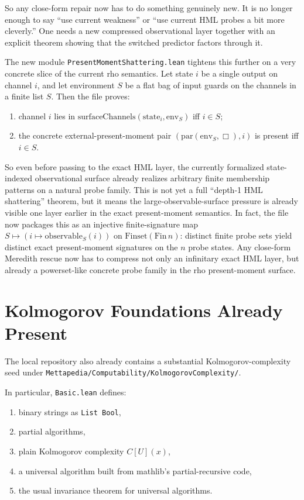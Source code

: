 \documentclass[11pt]{article}
\theoremstyle{remark}
\begin{document}
So any close-form repair now has to do something genuinely new.  It is no
longer enough to say ``use current weakness'' or ``use current HML probes a bit
more cleverly.''  One needs a new compressed observational layer together with
an explicit theorem showing that the switched predictor factors through it.

The new module \texttt{PresentMomentShattering.lean} tightens this further on a
very concrete slice of the current rho semantics.  Let state \(i\) be a single
output on channel \(i\), and let environment \(S\) be a flat bag of input
guards on the channels in a finite list \(S\).  Then the file proves:
\begin{enumerate}[leftmargin=1.5em]
  \item channel \(i\) lies in
  \(\mathrm{surfaceChannels}(\mathrm{state}_i,\mathrm{env}_S)\) iff \(i \in S\);
  \item the concrete external-present-moment pair
  \((\mathrm{par}(\mathrm{env}_S,\Box), i)\) is present iff \(i \in S\).
\end{enumerate}

So even before passing to the exact HML layer, the currently formalized
state-indexed observational surface already realizes arbitrary finite
membership patterns on a natural probe family.  This is not yet a full
``depth-1 HML shattering'' theorem, but it means the large-observable-surface
pressure is already visible one layer earlier in the exact present-moment
semantics.  In fact, the file now packages this as an injective finite-signature
map \(S \mapsto (i \mapsto \mathrm{observable}_S(i))\) on
\(\mathrm{Finset}(\mathrm{Fin}\,n)\): distinct finite probe sets yield distinct
exact present-moment signatures on the \(n\) probe states.  Any close-form
Meredith rescue now has to compress not only an infinitary exact HML layer, but
already a powerset-like concrete probe family in the rho present-moment surface.

\section{Kolmogorov Foundations Already Present}

The local repository also already contains a substantial Kolmogorov-complexity seed
under \texttt{Mettapedia/Computability/KolmogorovComplexity/}.

In particular, \texttt{Basic.lean} defines:
\begin{enumerate}[leftmargin=1.5em]
  \item binary strings as \texttt{List Bool},
  \item partial algorithms,
  \item plain Kolmogorov complexity \(C[U](x)\),
  \item a universal algorithm built from mathlib's partial-recursive code,
  \item the usual invariance theorem for universal algorithms.
\end{enumerate}
\end{document}
